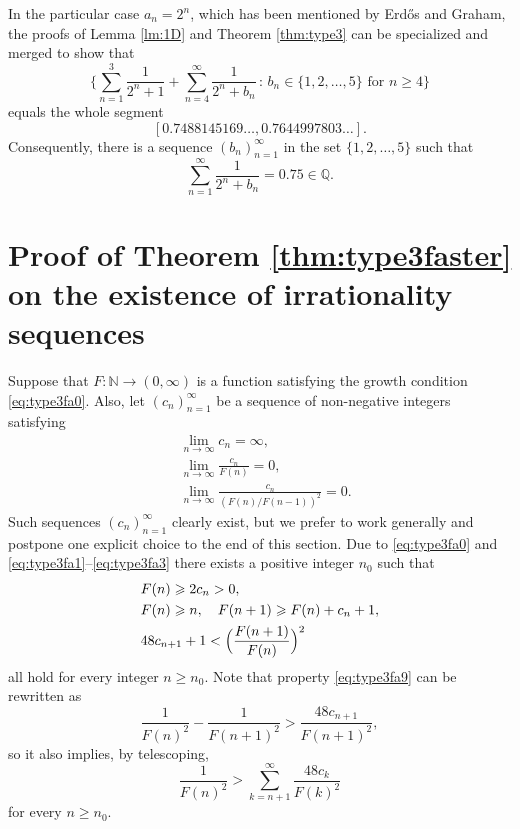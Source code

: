 \documentclass[11pt,letterpaper,reqno]{amsart}
\numberwithin{equation}{section}
\theoremstyle{definition}
\numberwithin{equation}{section}
\begin{document}
In the particular case $a_n=2^n$, which has been mentioned by Erd\H{o}s and Graham, the proofs of Lemma \ref{lm:1D} and Theorem \ref{thm:type3} can be specialized and merged to show that
\[ \bigg\{ \sum_{n=1}^{3}\frac{1}{2^n+1} + \sum_{n=4}^{\infty}\frac{1}{2^n+b_n} \,:\, b_n\in \{1,2,\ldots,5\} \text{ for } n\geqslant 4 \bigg\} \]
equals the whole segment
\[ [0.7488145169\ldots, 0.7644997803\ldots]. \]
Consequently, there is a sequence $(b_n)_{n=1}^{\infty}$ in the set $\{1,2,\ldots,5\}$ such that
\[ \sum_{n=1}^{\infty} \frac{1}{2^n+b_n} = 0.75 \in\mathbb{Q}. \]


\section{Proof of Theorem \ref{thm:type3faster} on the existence of irrationality sequences}
\label{sec:type3construction}

Suppose that $F\colon\mathbb{N}\to(0,\infty)$ is a function satisfying the growth condition \eqref{eq:type3fa0}.
Also, let $(c_n)_{n=1}^{\infty}$ be a sequence of non-negative integers satisfying
{\allowdisplaybreaks
\begin{subequations}
\begin{align}
& \lim_{n\to\infty} c_n = \infty, \label{eq:type3fa1} \\
& \lim_{n\to\infty} \frac{c_n}{F(n)} = 0, \label{eq:type3fa2} \\
& \lim_{n\to\infty} \frac{c_n}{(F(n)/F(n-1))^2} = 0. \label{eq:type3fa3}
\end{align}
\end{subequations}
}
Such sequences $(c_n)_{n=1}^{\infty}$ clearly exist, but we prefer to work generally and postpone one explicit choice to the end of this section.
Due to \eqref{eq:type3fa0} and \eqref{eq:type3fa1}--\eqref{eq:type3fa3} there exists a positive integer $n_0$ such that
{\allowdisplaybreaks
\begin{subequations}
\begin{align}
& F(n) \geqslant 2c_n > 0, \label{eq:type3fb4} \\
& F(n)\geqslant n, \quad F(n+1)\geqslant F(n) + c_n + 1, \label{eq:type3fa4} \\
& 48 c_{n+1} + 1 < \Bigl(\frac{F(n+1)}{F(n)}\Bigr)^2 \label{eq:type3fa9}
\end{align}
\end{subequations}
}
all hold for every integer $n\geqslant n_0$.
Note that property \eqref{eq:type3fa9} can be rewritten as
\[ \frac{1}{F(n)^2} - \frac{1}{F(n+1)^2} > \frac{48c_{n+1}}{F(n+1)^2}, \]
so it also implies, by telescoping,
\begin{equation}\label{eq:type3fa5}
\frac{1}{F(n)^2} > \sum_{k=n+1}^{\infty} \frac{48c_k}{F(k)^2}
\end{equation}
for every $n\geqslant n_0$.
\end{document}
